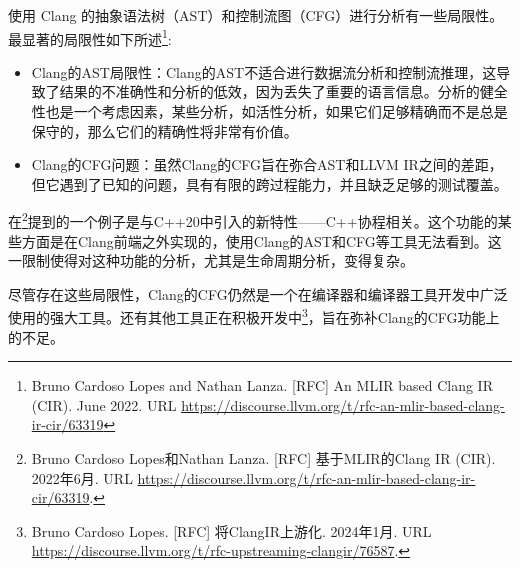 
使用 Clang 的抽象语法树（AST）和控制流图（CFG）进行分析有一些局限性。最显著的局限性如下所述\footnote{Bruno Cardoso Lopes and Nathan Lanza. [RFC] An MLIR based Clang IR (CIR). June 2022. URL \url{https://discourse.llvm.org/t/rfc-an-mlir-based-clang-ir-cir/63319}}:


\begin{itemize}
\item
Clang的AST局限性：Clang的AST不适合进行数据流分析和控制流推理，这导致了结果的不准确性和分析的低效，因为丢失了重要的语言信息。分析的健全性也是一个考虑因素，某些分析，如活性分析，如果它们足够精确而不是总是保守的，那么它们的精确性将非常有价值。

\item
Clang的CFG问题：虽然Clang的CFG旨在弥合AST和LLVM IR之间的差距，但它遇到了已知的问题，具有有限的跨过程能力，并且缺乏足够的测试覆盖。
\end{itemize}


在\footnote{Bruno Cardoso Lopes和Nathan Lanza. [RFC] 基于MLIR的Clang IR (CIR). 2022年6月. URL \url{https://discourse.llvm.org/t/rfc-an-mlir-based-clang-ir-cir/63319}.}提到的一个例子是与C++20中引入的新特性——C++协程相关。这个功能的某些方面是在Clang前端之外实现的，使用Clang的AST和CFG等工具无法看到。这一限制使得对这种功能的分析，尤其是生命周期分析，变得复杂。

尽管存在这些局限性，Clang的CFG仍然是一个在编译器和编译器工具开发中广泛使用的强大工具。还有其他工具正在积极开发中\footnote{Bruno Cardoso Lopes. [RFC] 将ClangIR上游化. 2024年1月. URL \url{https://discourse.llvm.org/t/rfc-upstreaming-clangir/76587}.}，旨在弥补Clang的CFG功能上的不足。
